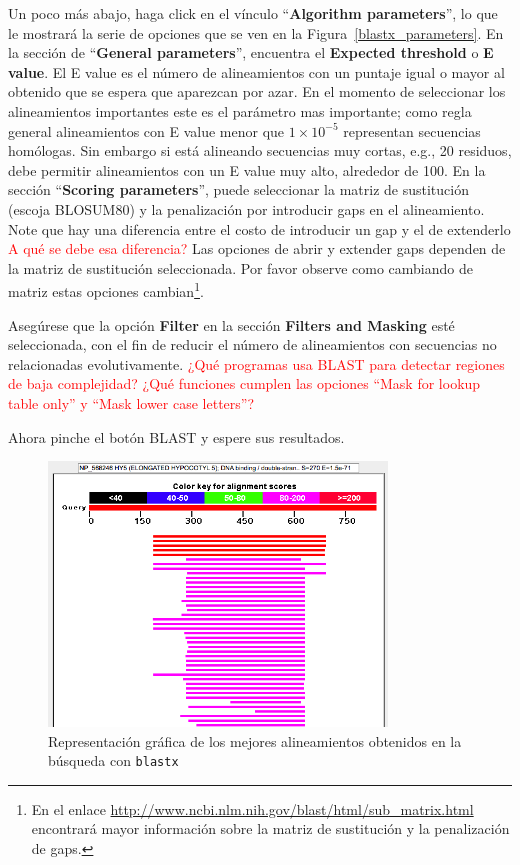 \documentclass[letter,11pt]{book}
\begin{document}
Un poco más abajo, haga click en el vínculo ``\textbf{Algorithm parameters}'', lo que le mostrará la serie de opciones que se ven en la Figura~\ref{blastx_parameters}. En la sección de ``\textbf{General parameters}'', encuentra el \textbf{Expected threshold} o \textbf{E value}. El E value es el número de alineamientos con un puntaje igual o mayor al obtenido que se espera que aparezcan por azar. En el momento de seleccionar los alineamientos importantes este es el parámetro mas importante; como regla general alineamientos con E value menor que $1\times10^{-5}$ representan secuencias homólogas. Sin embargo si está alineando secuencias muy cortas, e.g., 20 residuos, debe permitir alineamientos con un E value muy alto, alrededor de 100. En la sección ``\textbf{Scoring parameters}'', puede seleccionar la matriz de sustitución (escoja BLOSUM80) y la penalización por introducir gaps en el alineamiento.  Note que hay una diferencia entre el costo de introducir un gap y el de extenderlo \textcolor{red}{{\textquestiondown}A qué se debe esa diferencia?} Las opciones de abrir y extender gaps dependen de la matriz de sustitución seleccionada. Por favor observe como cambiando de matriz estas opciones cambian\footnote{En el enlace \url{http://www.ncbi.nlm.nih.gov/blast/html/sub_matrix.html} encontrará mayor información sobre la matriz de sustitución y la penalización de gaps.}.

Asegúrese que la opción \textbf{Filter} en la sección \textbf{Filters and Masking} esté seleccionada, con el fin de reducir el número de alineamientos con secuencias no relacionadas evolutivamente. \textcolor{red}{¿Qué programas usa BLAST para detectar regiones de baja complejidad?} \textcolor{red}{¿Qué funciones cumplen las opciones ``Mask for lookup table only'' y ``Mask lower case letters''?}

Ahora pinche el botón \textsc{BLAST} y espere sus resultados.

\begin{figure}[h!]
\centering
 \includegraphics[width=9cm]{Figs/blastxres1.png}
  \caption[Resultados blast: gráfica]{\label{fig:blastxres1}Representación gráfica de los mejores alineamientos obtenidos en la búsqueda con \Verb+blastx+}
\end{figure}
\end{document}
